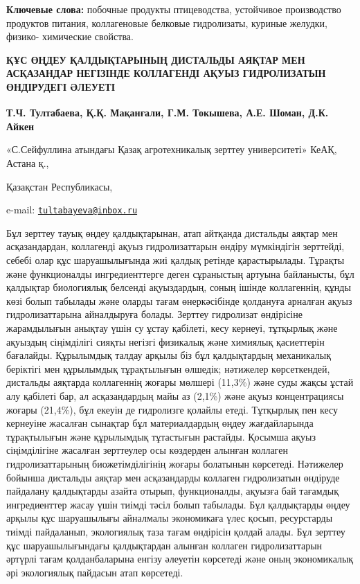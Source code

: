 {\bfseries Ключевые слова:} побочные продукты птицеводства, устойчивое
производство продуктов питания, коллагеновые белковые гидролизаты,
куриные желудки, физико- химические свойства.

\begin{articleheader}
{\bfseries ҚҰС ӨҢДЕУ ҚАЛДЫҚТАРЫНЫҢ ДИСТАЛЬДЫ АЯҚТАР МЕН АСҚАЗАНДАР НЕГІЗІНДЕ
КОЛЛАГЕНДІ АҚУЫЗ ГИДРОЛИЗАТЫН ӨНДІРУДЕГІ ӘЛЕУЕТІ}

{\bfseries Т.Ч. Тултабаева\textsuperscript{\envelope }, Қ.Қ. Мақанғали, Г.М.
Токышева, А.Е. Шоман, Д.К. Айкен}
\end{articleheader}

\begin{affiliation}
«С.Сейфуллина атындағы Қазақ агротехникалық зерттеу университеті» КеАҚ,
Астана қ.,

Қазақстан Республикасы,

e-mail: \href{mailto:tultabayeva@inbox.ru}{\nolinkurl{tultabayeva@inbox.ru}}
\end{affiliation}

Бұл зерттеу тауық өңдеу қалдықтарынан, атап айтқанда дистальды аяқтар
мен асқазандардан, коллагенді ақуыз гидролизаттарын өндіру мүмкіндігін
зерттейді, себебі олар құс шаруашылығында жиі қалдық ретінде
қарастырылады. Тұрақты және функционалды ингредиенттерге деген
сұраныстың артуына байланысты, бұл қалдықтар биологиялық белсенді
ақуыздардың, соның ішінде коллагеннің, құнды көзі болып табылады және
оларды тағам өнеркәсібінде қолдануға арналған ақуыз гидролизаттарына
айналдыруға болады. Зерттеу гидролизат өндірісіне жарамдылығын анықтау
үшін су ұстау қабілеті, кесу кернеуі, тұтқырлық және ақуыздың
сіңімділігі сияқты негізгі физикалық және химиялық қасиеттерін
бағалайды. Құрылымдық талдау арқылы біз бұл қалдықтардың механикалық
беріктігі мен құрылымдық тұрақтылығын өлшедік; нәтижелер көрсеткендей,
дистальды аяқтарда коллагеннің жоғары мөлшері (11,3\%) және суды жақсы
ұстай алу қабілеті бар, ал асқазандардың майы аз (2,1\%) және ақуыз
концентрациясы жоғары (21,4\%), бұл екеуін де гидролизге қолайлы етеді.
Тұтқырлық пен кесу кернеуіне жасалған сынақтар бұл материалдардың өңдеу
жағдайларында тұрақтылығын және құрылымдық тұтастығын растайды. Қосымша
ақуыз сіңімділігіне жасалған зерттеулер осы көздерден алынған коллаген
гидролизаттарының биожетімділігінің жоғары болатынын көрсетеді.
Нәтижелер бойынша дистальды аяқтар мен асқазандарды коллаген
гидролизатын өндіруде пайдалану қалдықтарды азайта отырып, функционалды,
ақуызға бай тағамдық ингредиенттер жасау үшін тиімді тәсіл болып
табылады. Бұл қалдықтарды өңдеу арқылы құс шаруашылығы айналмалы
экономикаға үлес қосып, ресурстарды тиімді пайдаланып, экологиялық таза
тағам өндірісін қолдай алады. Бұл зерттеу құс шаруашылығындағы
қалдықтардан алынған коллаген гидролизаттарын әртүрлі тағам қолданбаларына енгізу әлеуетін
көрсетеді және оның экономикалық әрі экологиялық пайдасын атап
көрсетеді.

